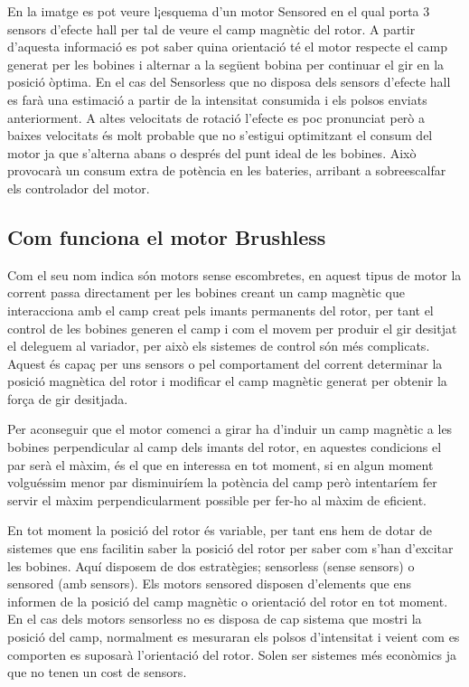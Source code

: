 En la imatge es pot veure l¡esquema d'un motor Sensored en el qual porta 3 sensors d'efecte hall per tal de veure el camp magnètic del rotor. A partir d'aquesta informació es pot saber quina orientació té el motor respecte el camp generat per les bobines i alternar a la següent bobina per continuar el gir en la posició òptima. En el cas del Sensorless que no disposa dels sensors d'efecte hall es farà una estimació a partir de la intensitat consumida i els polsos enviats anteriorment. A altes velocitats de rotació l'efecte es poc pronunciat però a baixes velocitats és molt probable que no s'estigui optimitzant el consum del motor ja que s'alterna abans o després del punt ideal de les bobines. Això provocarà un consum extra de potència en les bateries, arribant a sobreescalfar els controlador del motor. 

\subsection{Com funciona el motor Brushless}
Com el seu nom indica són motors sense escombretes, en aquest tipus de motor la corrent passa directament per les bobines creant un camp magnètic que interacciona amb el camp creat pels imants permanents del rotor, per tant el control de les bobines generen el camp i com el movem per produir el gir desitjat el deleguem al variador, per això els sistemes de control són més complicats. Aquest és capaç per uns sensors o pel comportament del corrent determinar la posició magnètica del rotor i modificar el camp magnètic generat per obtenir la força de gir desitjada.
    
Per aconseguir que el motor comenci a girar ha d'induir un camp \newline magnètic a les bobines perpendicular al camp dels imants del rotor, en aquestes condicions el par serà el màxim, és el que en interessa en tot moment, si en algun moment volguéssim menor par disminuiríem la potència del camp però intentaríem fer servir el màxim perpendicularment possible per fer-ho al màxim de eficient.\smallskip
    
En tot moment la posició del rotor és variable, per tant ens hem de dotar de sistemes que ens facilitin saber la posició del rotor per saber com s'han d'excitar les bobines. Aquí disposem de dos estratègies; sensorless (sense sensors) o sensored (amb sensors). Els motors sensored disposen \newline d'elements que ens informen de la posició del camp magnètic o orientació del rotor en tot moment. En el cas dels motors sensorless no es disposa de cap sistema que mostri la posició del camp, normalment es mesuraran els polsos d'intensitat i veient com es comporten es suposarà l'orientació del rotor. Solen ser sistemes més econòmics ja que no tenen un cost de sensors.

